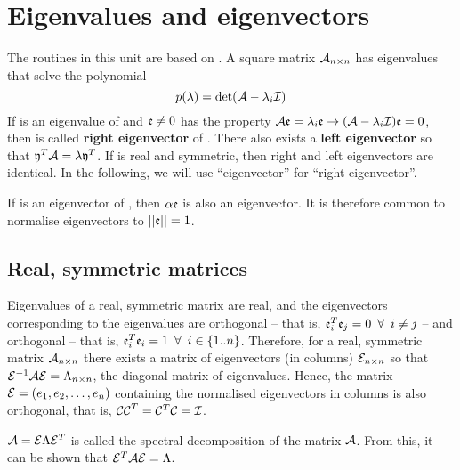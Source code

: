 
\section{Eigenvalues and eigenvectors}

The routines in this unit are based on \parencite{Ste-73,Atk-83,Sed-83,Bor-86,Eng-87,Pre-89,Ren-02}. A square matrix \(\mathcal{A}_{n \times n} \) has  eigenvalues  that solve the polynomial
\begin{equation}
  p(\lambda) = \det(\mathcal{A} - \lambda_i \mathcal{I})
\end{equation}
If  is an eigenvalue of  and \( \mathfrak{e} \neq 0 \) has the property \( \mathcal{A} \mathfrak{e} = \lambda_i \mathfrak{e} \rightarrow (\mathcal{A} - \lambda_i \mathcal{I}) \mathfrak{e} = 0 \), then  is called \textbf{right eigenvector} of . There also exists a \textbf{left eigenvector}  so that \( \mathfrak{y}^T \mathcal{A} = \lambda \mathfrak{y}^T \). If  is real and symmetric, then right and left eigenvectors are identical. In the following, we will use ``eigenvector'' for ``right eigenvector''.

If  is an eigenvector of , then \(\alpha \mathfrak{e} \) is also an eigenvector. It is therefore common to normalise eigenvectors to \(||\mathfrak{e}|| = 1 \).

\subsection{Real, symmetric matrices}

Eigenvalues of a real, symmetric matrix  are real, and the eigenvectors corresponding to the eigenvalues are orthogonal -- that is, \(\mathfrak{e}_i^T \mathfrak{e}_j = 0\enspace\forall\enspace i \neq j \) -- and orthogonal -- that is, \(\mathfrak{e}^T_i \mathfrak{e}_i = 1\enspace\forall\enspace i \in \{1..n\} \). Therefore, for a real, symmetric matrix \(\mathcal{A}_{n\times n} \) there exists a matrix of eigenvectors (in columns) \(\mathcal{E}_{n\times n} \) so that \(\mathcal{E}^{-1}\mathcal{AE} = \Lambda_{n\times n} \), the diagonal matrix of eigenvalues. Hence, the matrix \(\mathcal{E} = (e_1, e_2, \ldots, e_n) \) containing the normalised eigenvectors in columns is also orthogonal, that is, \(\mathcal{CC}^T = \mathcal{C}^T\mathcal{C} = \mathcal{I} \).

\( \mathcal{A} = \mathcal{E}\Lambda\mathcal{E}^T \) is called the spectral decomposition of the matrix \(\mathcal{A} \). From this, it can be shown that \(\mathcal{E}^T\mathcal{AE} = \Lambda \).

